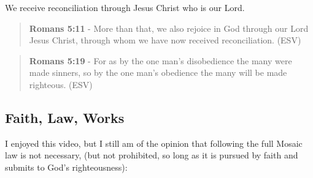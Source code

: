 \documentclass[11pt]{article}
\begin{document}
We receive reconciliation through Jesus Christ who is our Lord.

\begin{quote}
\textbf{Romans 5:11} - More than that, we also rejoice in God through our Lord Jesus Christ, through whom we have now received reconciliation. (ESV)
\end{quote}

\begin{quote}
\textbf{Romans 5:19} - For as by the one man's disobedience the many were made sinners, so by the one man's obedience the many will be made righteous. (ESV)
\end{quote}

\subsection{Faith, Law, Works}
\label{sec:orgf32144c}
I enjoyed this video, but I still am of the opinion that following the full Mosaic law is not necessary, (but not prohibited, so long as it is pursued by faith and submits to God's righteousness):
\end{document}
